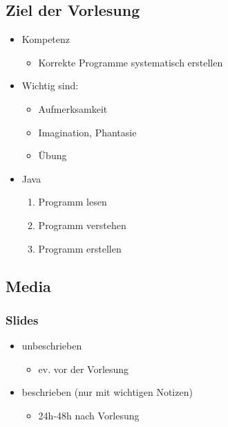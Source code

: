 \documentclass[11pt]{article}
\begin{document}
\subsection{Ziel der Vorlesung}
\label{sec:orga27870d}
\begin{itemize}
\item Kompetenz\\
\begin{itemize}
\item Korrekte Programme systematisch erstellen\\
\end{itemize}
\item Wichtig sind:\\
\begin{itemize}
\item Aufmerksamkeit\\
\item Imagination, Phantasie\\
\item Übung\\
\end{itemize}
\item Java\\
\begin{enumerate}
\item Programm lesen\\
\item Programm verstehen\\
\item Programm erstellen\\
\end{enumerate}
\end{itemize}

\subsection{Media}
\label{sec:orgc839a6e}
\subsubsection{Slides}
\label{sec:org1c21afc}
\begin{itemize}
\item unbeschrieben\\
\begin{itemize}
\item ev. vor der Vorlesung\\
\end{itemize}
\item beschrieben (nur mit wichtigen Notizen)\\
\begin{itemize}
\item 24h-48h nach Vorlesung\\
\end{itemize}
\end{itemize}
\end{document}
